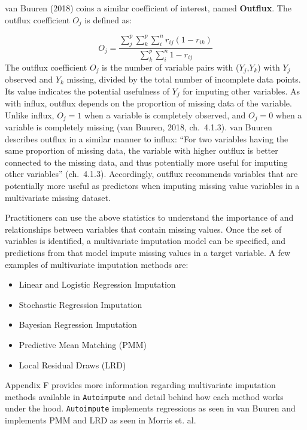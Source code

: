 \documentclass[12pt,oneside]{chicagocapstone}
\providecommand{\tightlist}{%
  \setlength{\itemsep}{0pt}\setlength{\parskip}{0pt}}
\begin{document}
van Buuren (2018) coins a similar coefficient of interest, named
\textbf{Outflux}. The outflux coefficient \(O_j\) is defined as:

\[O_j = \frac{\sum_j^p\sum_k^p\sum_i^n r_{ij}(1-r_{ik})}{\sum_k^p\sum_i^n 1-r_{ij}}\]
The outflux coefficient \(O_j\) is the number of variable pairs with
(\(Y_j\),\(Y_k\)) with \(Y_j\) observed and \(Y_k\) missing, divided by
the total number of incomplete data points. Its value indicates the
potential usefulness of \(Y_j\) for imputing other variables. As with
influx, outflux depends on the proportion of missing data of the
variable. Unlike influx, \(O_j=1\) when a variable is completely
observed, and \(O_j=0\) when a variable is completely missing (van
Buuren, 2018, ch.~4.1.3). van Buuren describes outflux in a similar
manner to influx: ``For two variables having the same proportion of
missing data, the variable with higher outflux is better connected to
the missing data, and thus potentially more useful for imputing other
variables'' (ch.~4.1.3). Accordingly, outflux recommends variables that
are potentially more useful as predictors when imputing missing value
variables in a multivariate missing dataset.

Practitioners can use the above statistics to understand the importance
of and relationships between variables that contain missing values. Once
the set of variables is identified, a multivariate imputation model can
be specified, and predictions from that model impute missing values in a
target variable. A few examples of multivariate imputation methods are:
\begin{itemize}
\tightlist
\item
  Linear and Logistic Regression Imputation
\item
  Stochastic Regression Imputation
\item
  Bayesian Regression Imputation
\item
  Predictive Mean Matching (PMM)
\item
  Local Residual Draws (LRD)
\end{itemize}
Appendix F provides more information regarding multivariate imputation
methods available in \texttt{Autoimpute} and detail behind how each
method works under the hood. \texttt{Autoimpute} implements regressions
as seen in van Buuren and implements PMM and LRD as seen in Morris et.
al.
\end{document}
